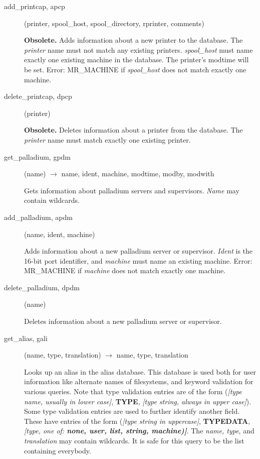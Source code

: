 \begin{description}
\item[add\_printcap, apcp](printer, spool\_host, spool\_directory,
rprinter, comments)

{\bf Obsolete.}
Adds information about a new printer to the database.  The {\em printer}
name must not match any existing printers.  {\em spool\_host} must name
exactly one existing machine in the database.  The printer's modtime
will be set.  Error: MR\_MACHINE if {\em spool\_host} does not match
exactly one machine.

\item[delete\_printcap, dpcp](printer)

{\bf Obsolete.}
Deletes information about a printer from the database.  The
{\em printer} name must match exactly one existing printer.

\item[get\_palladium, gpdm](name) $\rightarrow$ name, ident, machine,
modtime, modby, modwith

Gets information about palladium servers and supervisors.  {\em Name}
may contain wildcards.

\item[add\_palladium, apdm](name, ident, machine)

Adds information about a new palladium server or supervisor.  {\em Ident} is
the 16-bit port identifier, and {\em machine} must name an existing
machine.  Error: MR\_MACHINE if {\em machine} does not match exactly one
machine.

\item[delete\_palladium, dpdm](name)

Deletes information about a new palladium server or supervisor.

\item[get\_alias, gali](name, type, translation) $\rightarrow$ name, type,
translation

Looks up an alias in the alias database.  This database is used both
for user information like alternate names of filesystems, and keyword
validation for various queries.  Note that type validation entries are
of the form ({\em [type name, usually in lower case]}, {\bf TYPE},
{\em [type string, always in upper case]}).  Some type validation
entries are used to further identify another field.  These have
entries of the form ({\em [type string in uppercase]}, {\bf TYPEDATA},
{\em [type, one of: {\bf none, user, list, string, machine)]}}.  The
{\em name, type}, and {\em translation} may contain wildcards.  It is safe
for this query to be the list containing everybody.


\end{description}
